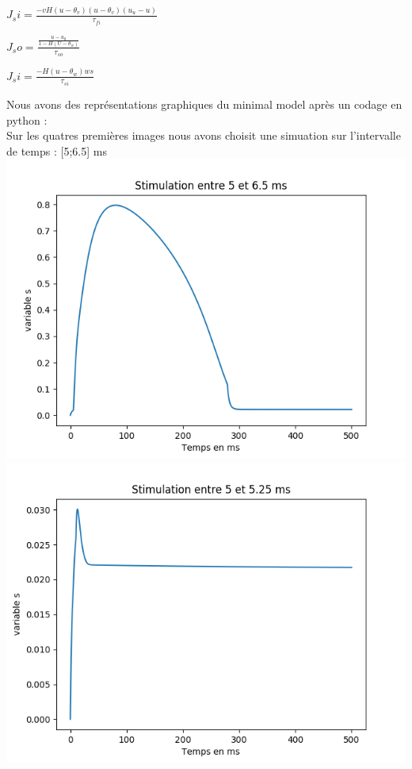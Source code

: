 \documentclass[a4paper,12pt,twoside]{report}
\begin{document}
$J_si=\frac{-vH(u-\theta_v)(u-\theta_v)(u_u-u)}{\tau_{fi}}$

$J_so=\frac{\frac{u-u_0}{1-H(U-\theta_w)}}{\tau_{so}}$

$J_si=\frac{-H(u-\theta_w)ws}{\tau_{si}}$



Nous avons des représentations graphiques du minimal model après un codage en python :\\

Sur les quatres premières images nous avons choisit une simuation sur l'intervalle de temps : [5;6.5] ms\\


\includegraphics[scale=0.5]{./s(t).png}\\
\includegraphics[scale=0.5]{./s(t)_2.png}\\
\end{document}
